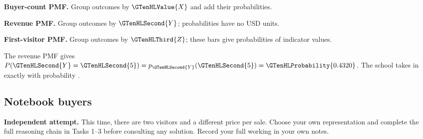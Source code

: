 \Needspace{6.8cm}
\par\noindent \begin{minipage}[t]{.485\linewidth}
\centering
{}
\par\small \textbf{Buyer-count PMF.} Group outcomes by $\GTenHLValue{X}$ and add their probabilities.
\end{minipage}\hfill\begin{minipage}[t]{.485\linewidth}
\centering
{}
\par\small \textbf{Revenue PMF.} Group outcomes by $\GTenHLSecond{Y}$; probabilities have no USD units.
\end{minipage}\par\medskip
\Needspace{6.8cm}
\par\noindent \begin{minipage}[t]{.485\linewidth}
\centering
{}
\par\small \textbf{First-visitor PMF.} Group outcomes by $\GTenHLThird{Z}$; these bars give probabilities of indicator values.
\end{minipage}\par\medskip

The revenue PMF gives $P(\GTenHLSecond{Y}=\GTenHLSecond{5})=p_{\GTenHLSecond{Y}}(\GTenHLSecond{5})=\GTenHLProbability{0.4320}$. The school takes in exactly  with probability .


\subsection{Notebook buyers}
\label{subsec:t2-c1-notebook-buyers}
\textbf{Independent attempt.} This time, there are two visitors and a different price per sale. Choose your own representation and complete the full reasoning chain in Tasks 1--3 before consulting any solution. Record your full working in your own notes.

